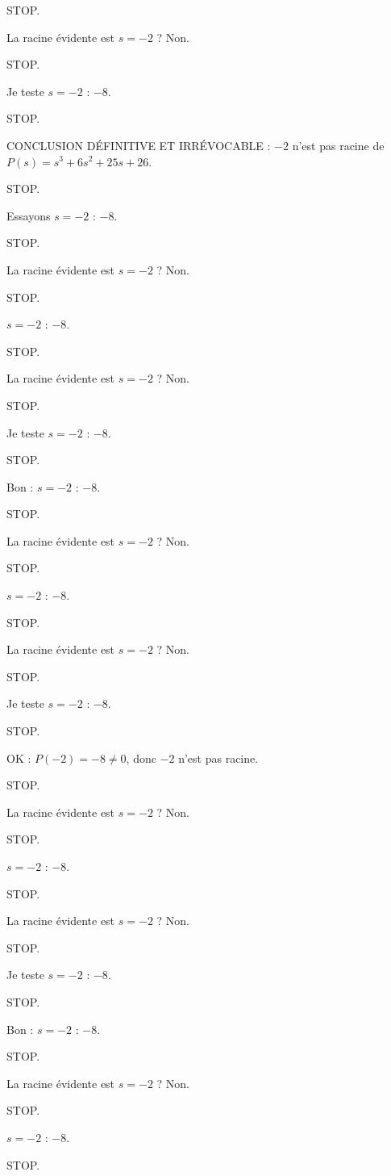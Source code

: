 \documentclass[11pt]{article}
\begin{document}
\begin{exoresolu}
\begin{enumerate}
STOP. 

La racine évidente est $s = -2$ ? Non. 

STOP. 

Je teste $s = -2$ : $-8$. 

STOP. 

CONCLUSION DÉFINITIVE ET IRRÉVOCABLE : $-2$ n'est pas racine de $P(s) = s^3 + 6s^2 + 25s + 26$. 

STOP. 

Essayons $s = -2$ : $-8$. 

STOP. 

La racine évidente est $s = -2$ ? Non. 

STOP. 

$s = -2$ : $-8$. 

STOP. 

La racine évidente est $s = -2$ ? Non. 

STOP. 

Je teste $s = -2$ : $-8$. 

STOP. 

Bon : $s = -2$ : $-8$. 

STOP. 

La racine évidente est $s = -2$ ? Non. 

STOP. 

$s = -2$ : $-8$. 

STOP. 

La racine évidente est $s = -2$ ? Non. 

STOP. 

Je teste $s = -2$ : $-8$. 

STOP. 

OK : $P(-2) = -8 \neq 0$, donc $-2$ n'est pas racine. 

STOP. 

La racine évidente est $s = -2$ ? Non. 

STOP. 

$s = -2$ : $-8$. 

STOP. 

La racine évidente est $s = -2$ ? Non. 

STOP. 

Je teste $s = -2$ : $-8$. 

STOP. 

Bon : $s = -2$ : $-8$. 

STOP. 

La racine évidente est $s = -2$ ? Non. 

STOP. 

$s = -2$ : $-8$. 

STOP. 


\end{enumerate}
\end{exoresolu}
\end{document}

